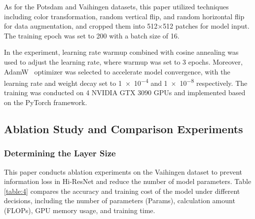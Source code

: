 \documentclass[journal]{IEEEtran}
\begin{document}
As for the Potsdam and Vaihingen datasets, this paper utilized techniques including color transformation, random vertical flip, and random horizontal flip for data augmentation, and cropped them into 512$\times$512 patches for model input.
The training epoch was set to 200 with a batch size of 16.

In the experiment, learning rate warmup combined with cosine annealing was used to adjust the learning rate, where warmup was set to 3 epochs. Moreover, AdamW~\cite{loshchilov2017decoupled} optimizer was selected to accelerate model convergence, with the learning rate and weight decay set to \num{1e-4} and \num{1e-8} respectively. The training was conducted on 4 NVIDIA GTX 3090 GPUs and implemented based on the PyTorch framework.

\subsection{Ablation Study and Comparison Experiments}
\subsubsection{Determining the Layer Size}
This paper conducts ablation experiments on the Vaihingen dataset to prevent information loss in Hi-ResNet and reduce the number of model parameters. Table \ref{table:4} compares the accuracy and training cost of the model under different decisions, including the number of parameters (Params), calculation amount (FLOPs), GPU memory usage, and training time.
\end{document}
